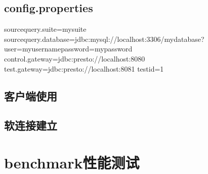 \documentclass[letterpaper,10pt,english]{sphinxmanual}
\begin{document}
\subsection{config.properties}
\label{\detokenize{installation/verifier:config-properties}}
\begin{sphinxVerbatim}[commandchars=\\\{\}]
source\PYGZhy{}query.suite=my\PYGZus{}suite
source\PYGZhy{}query.database=jdbc:mysql://localhost:3306/my\PYGZus{}database?user=my\PYGZus{}username\PYGZam{}password=my\PYGZus{}password
control.gateway=jdbc:presto://localhost:8080
test.gateway=jdbc:presto://localhost:8081
test\PYGZhy{}id=1
\end{sphinxVerbatim}


\subsection{客户端使用}
\label{\detokenize{installation/verifier:id3}}
\begin{sphinxVerbatim}[commandchars=\\\{\}]
  
\end{sphinxVerbatim}


\subsection{软连接建立}
\label{\detokenize{installation/verifier:id4}}
\begin{sphinxVerbatim}[commandchars=\\\{\}]
   
\end{sphinxVerbatim}


\section{benchmark性能测试}
\label{\detokenize{installation/benchmark:benchmark}}\label{\detokenize{installation/benchmark::doc}}
\end{document}
